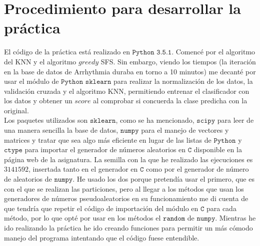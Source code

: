 \documentclass[11pt,leqno]{article}
\begin{document}
\section{Procedimiento para desarrollar la práctica}

El código de la práctica está realizado en $\texttt{Python 3.5.1}$. Comencé por el algoritmo del KNN y el algoritmo $\textit{greedy}$ SFS. Sin embargo, viendo los tiempos (la iteración en la base de datos de Arrhythmia duraba en torno a 10 minutos) me decanté por usar el módulo de $\texttt{Python}$ $\texttt{sklearn}$ para realizar la normalización de los datos, la validación cruzada y el algoritmo KNN, permitiendo entrenar el clasificador con los datos y obtener un $\textit{score}$ al comprobar si concuerda la clase predicha con la original.\\

Los paquetes utilizados son $\texttt{sklearn}$, como se ha mencionado, $\texttt{scipy}$ para leer de una manera sencilla la base de datos, $\texttt{numpy}$ para el manejo de vectores y matrices y tratar que sea algo más eficiente en lugar de las listas de $\texttt{Python}$ y $\texttt{ctype}$ para importar el generador de números aleatorios en $\texttt{C}$ disponible en la página web de la asignatura. La semilla con la que he realizado las ejecuciones es $3141592$, insertada tanto en el generador en $\texttt{C}$ como por el generador de número de aleatorios de $\texttt{numpy}$. He usado los dos porque pretendía usar el primero, que es con el que se realizan las particiones, pero al llegar a los métodos que usan los generadores de números pseudoaleatorios en su funcionamiento me di cuenta de que tendría que repetir el código de importación del módulo en $\texttt{C}$ para cada método, por lo que opté por usar en los métodos el $\texttt{random}$ de $\texttt{numpy}$. Mientras he ido realizando la práctica he ido creando funciones para permitir un más cómodo manejo del programa intentando que el código fuese entendible.
\end{document}
